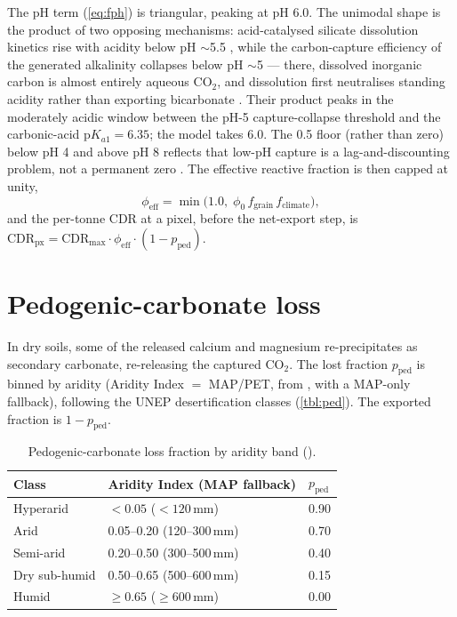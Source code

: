 \documentclass[openany]{book}
\newcommand{\co}{\ensuremath{\mathrm{CO_2}}}
\begin{document}
The pH term (\autoref{eq:fph}) is triangular, peaking at pH 6.0. The unimodal
shape is the product of two opposing mechanisms: acid-catalysed silicate
dissolution kinetics rise with acidity below pH $\sim$5.5
\citep{palandri2004, brantley2008}, while the carbon-capture efficiency of the
generated alkalinity collapses below pH $\sim$5 --- there, dissolved inorganic
carbon is almost entirely aqueous \co, and dissolution first neutralises
standing acidity rather than exporting bicarbonate
\citep{bertagni2022, holden2024, power2025}. Their product peaks in the
moderately acidic window between the pH-5 capture-collapse threshold and the
carbonic-acid $\mathrm{p}K_{a1} = 6.35$; the model takes 6.0. The 0.5 floor
(rather than zero) below pH 4 and above pH 8 reflects that low-pH capture is a
lag-and-discounting problem, not a permanent zero \citep{kanzaki2025}. The
effective reactive fraction is then capped at unity,
%
\begin{equation}
\phi_{\text{eff}} = \min\!\big(1.0,\; \phi_0\, f_{\text{grain}}\,
f_{\text{climate}}\big),
\label{eq:phieff}
\end{equation}
%
and the per-tonne CDR at a pixel, before the net-export step, is
$\mathrm{CDR_{px}} = \mathrm{CDR_{max}}\cdot\phi_{\text{eff}}\cdot
(1-p_{\text{ped}})$.

\section{Pedogenic-carbonate loss}

In dry soils, some of the released calcium and magnesium re-precipitates as
secondary carbonate, re-releasing the captured \co. The lost fraction
$p_{\text{ped}}$ is binned by aridity (Aridity Index $=$ MAP/PET, from
\citealp{zomer2022}, with a MAP-only fallback), following the UNEP desertification
classes (\autoref{tbl:ped}). The exported fraction is $1-p_{\text{ped}}$.

\begin{longtable}[]{@{}lll@{}}
\caption{Pedogenic-carbonate loss fraction by aridity band
(\citealp{unep1992, renforth2019}).}\label{tbl:ped}\\
\toprule
Class & Aridity Index (MAP fallback) & $p_{\text{ped}}$ \\
\midrule
\endhead
Hyperarid & $<0.05$ ($<120$\,mm) & 0.90 \\
Arid & 0.05--0.20 (120--300\,mm) & 0.70 \\
Semi-arid & 0.20--0.50 (300--500\,mm) & 0.40 \\
Dry sub-humid & 0.50--0.65 (500--600\,mm) & 0.15 \\
Humid & $\ge 0.65$ ($\ge 600$\,mm) & 0.00 \\
\bottomrule
\end{longtable}
\end{document}
